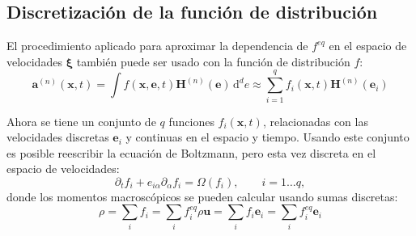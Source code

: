 \subsection{Discretizaci\'on de la funci\'on de distribuci\'on}
El procedimiento aplicado para aproximar la dependencia de $f^{eq}$ en el espacio de velocidades $\bm{\xi}$ tambi\'en puede ser usado con la funci\'on de distribuci\'on $f$:
\begin{equation}
	\bm{a}^{(n)}(\bm{x},t) = \int f(\bm{x}, \bm{e}, t) \bm{H}^{(n)}(\bm{e}) \, \mbox{d}^d e \approx \sum_{i=1}^q f_i(\bm{x},t)\bm{H}^{(n)}(\bm{e}_i)
\end{equation}

Ahora se tiene un conjunto de $q$ funciones $f_i(\bm{x},t)$, relacionadas con las velocidades discretas $\bm{e}_i$ y continuas en el espacio y tiempo. Usando este conjunto es posible reescribir la ecuaci\'on de Boltzmann, pero esta vez discreta en el espacio de velocidades:
\begin{equation}
	\partial_t f_i + e_{i\alpha} \partial_{\alpha} f_{i} = \Omega(f_i), \qquad i=1\ldots q,
	\label{eq:boltz_disc_vel}
\end{equation}
donde los momentos macrosc\'opicos se pueden calcular usando sumas discretas:
\begin{subequations}
	\begin{equation}
		\rho        = \sum_i f_i          = \sum_i f_i^{eq}
	\end{equation}
	\begin{equation}
		\rho \bm{u} = \sum_i f_i\bm{e}_i  = \sum_i f_i^{eq}\bm{e}_i
	\end{equation}
\end{subequations}



